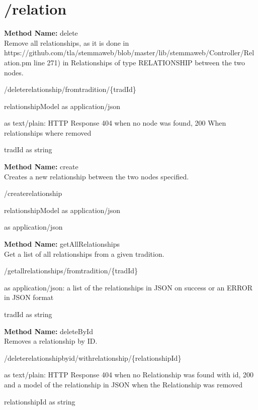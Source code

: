 \section{/relation}
\textbf{Method Name: }delete \\ Remove all relationships, as it is done in https://github.com/tla/stemmaweb/blob/master/lib/stemmaweb/Controller/Relation.pm line 271) in Relationships of type RELATIONSHIP between the two nodes.
\begin{post}
/deleterelationship/fromtradition/\{tradId\}
\end{post}
\begin{request}
relationshipModel as application/json
\end{request}
\begin{response}
 as text/plain: HTTP Response 404 when no node was found, 200 When relationships where removed
\end{response}
\begin{parameter}
tradId as string
\end{parameter}
\textbf{Method Name: }create \\ Creates a new relationship between the two nodes specified.
\begin{post}
/createrelationship
\end{post}
\begin{request}
relationshipModel as application/json
\end{request}
\begin{response}
 as application/json
\end{response}
\textbf{Method Name: }getAllRelationships \\ Get a list of all relationships from a given tradition.
\begin{get}
/getallrelationships/fromtradition/\{tradId\}
\end{get}
\begin{response}
 as application/json: a list of the relationships in JSON on success or an ERROR in JSON format
\end{response}
\begin{parameter}
tradId as string
\end{parameter}
\textbf{Method Name: }deleteById \\ Removes a relationship by ID.
\begin{delete}
/deleterelationshipbyid/withrelationship/\{relationshipId\}
\end{delete}
\begin{response}
 as text/plain: HTTP Response 404 when no Relationship was found with id, 200 and a model of the relationship in JSON when the Relationship was removed
\end{response}
\begin{parameter}
relationshipId as string
\end{parameter}
